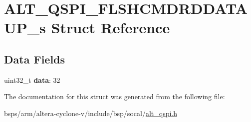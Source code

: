 \hypertarget{structALT__QSPI__FLSHCMDRDDATAUP__s}{}\section{A\+L\+T\+\_\+\+Q\+S\+P\+I\+\_\+\+F\+L\+S\+H\+C\+M\+D\+R\+D\+D\+A\+T\+A\+U\+P\+\_\+s Struct Reference}
\label{structALT__QSPI__FLSHCMDRDDATAUP__s}
\subsection*{Data Fields}
\begin{DoxyCompactItemize}
\item 
\mbox{\label{structALT__QSPI__FLSHCMDRDDATAUP__s_aa3851140dec1d2009255711023902848}} 
uint32\+\_\+t {\bfseries data}\+: 32
\end{DoxyCompactItemize}


The documentation for this struct was generated from the following file\+:\begin{DoxyCompactItemize}
\item 
bsps/arm/altera-\/cyclone-\/v/include/bsp/socal/\mbox{\hyperlink{include_2bsp_2socal_2alt__qspi_8h}{alt\+\_\+qspi.\+h}}\end{DoxyCompactItemize}
